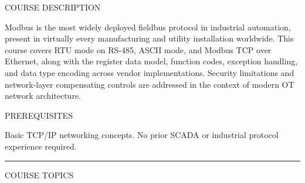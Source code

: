 \documentclass[10pt]{article}
\begin{document}

\vspace{0.70in}

{\small\sffamily\color{mgray}\MakeUppercase{Course Description}}
\smallskip

{\small Modbus is the most widely deployed fieldbus protocol in industrial automation, present in virtually every manufacturing and utility installation worldwide. This course covers RTU mode on RS-485, ASCII mode, and Modbus TCP over Ethernet, along with the register data model, function codes, exception handling, and data type encoding across vendor implementations. Security limitations and network-layer compensating controls are addressed in the context of modern OT network architecture.}

\smallskip
{\small\sffamily\color{mgray}\MakeUppercase{Prerequisites}}
\smallskip

{\small Basic TCP/IP networking concepts. No prior SCADA or industrial protocol experience required.}

\smallskip
{\color{mnavy}\rule{\linewidth}{1.2pt}}
\smallskip
{\small\sffamily\color{mgray}\MakeUppercase{Course Topics}}
\smallskip
\end{document}
